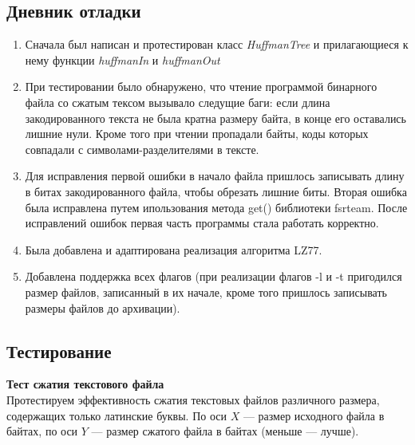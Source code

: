 \documentclass[12pt]{article}
\begin{document}
    \subsection*{Дневник отладки}

    \begin{enumerate}
    \item Сначала был написан и протестирован класс \textit{HuffmanTree} и прилагающиеся к нему функции \textit{huffmanIn} и \textit{huffmanOut}
    \item При тестировании было обнаружено, что чтение программой бинарного файла со сжатым тексом вызывало следущие баги: если длина закодированного текста не была кратна размеру байта, в конце его оставались лишние нули. Кроме того при чтении пропадали байты, коды которых совпадали с символами-разделителями в тексте.
    \item Для исправления первой ошибки в начало файла пришлось записывать длину в битах закодированного файла, чтобы обрезать лишние биты. Вторая ошибка была исправлена путем ипользования метода get() библиотеки fsrteam. После исправлений ошибок первая часть программы стала работать корректно.
    \item Была добавлена и адаптирована реализация алгоритма LZ77.
    \item Добавлена поддержка всех флагов (при реализации флагов -l и -t пригодился размер файлов, записанный в их начале, кроме того пришлось записывать размеры файлов до архивации).
    \end{enumerate}

    \subsection*{Тестирование}

    \textbf{Тест сжатия текстового файла} \\
    Протестируем эффективность сжатия текстовых файлов различного размера, 
    содержащих только латинские буквы. По оси $X$ — размер исходного файла в 
    байтах, по оси $Y$ — размер сжатого файла в байтах (меньше — лучше).

\end{document}
